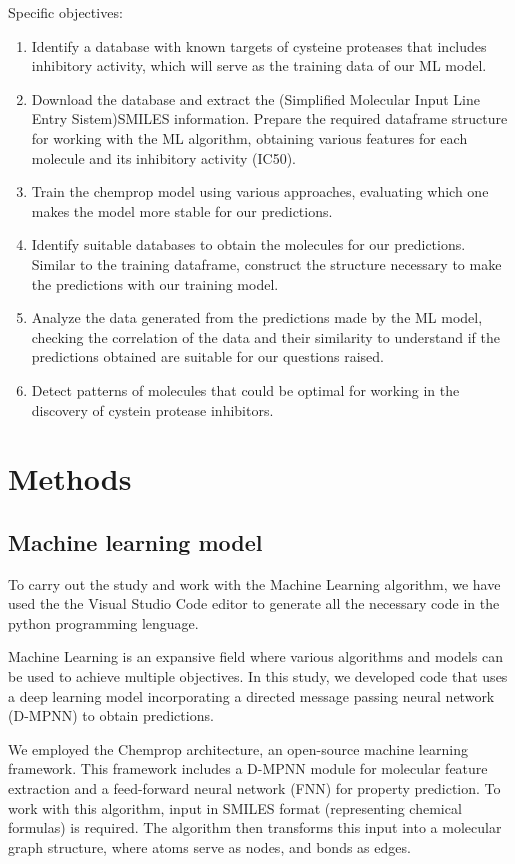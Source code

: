 \documentclass[final,times,twocolumn,article]{elsarticle}
\begin{document}
Specific objectives:

\begin{enumerate}
    \item Identify a database with known targets of cysteine proteases that includes inhibitory activity, which will serve as the training data of our ML model. 
    \item Download the database and extract the (Simplified Molecular Input Line Entry Sistem)SMILES information. Prepare the required dataframe structure for working with the ML algorithm, obtaining various features for each molecule and its inhibitory activity (IC50).
    \item Train the chemprop model using various approaches, evaluating which one makes the model more stable for our predictions. 
    \item Identify suitable databases to obtain the molecules for our predictions. Similar to the training dataframe, construct the structure necessary to make the predictions with our training model. 
    \item Analyze the data generated from the predictions made by the ML model, checking the correlation of the data and their similarity to understand if the predictions obtained are suitable for our questions raised. 
    \item Detect patterns of molecules that could be optimal for working in the discovery of cystein protease inhibitors. 
\end{enumerate}

\section{\textbf{Methods}}

\subsection{Machine learning model}

To carry out the study and work with the Machine Learning algorithm, we have used the the Visual Studio Code editor to generate all the necessary code in the python programming lenguage. 

Machine Learning is an expansive field where various algorithms and models can be used to achieve multiple objectives. In this study, we developed code that uses a deep learning model incorporating a directed message passing neural network (D-MPNN) to obtain predictions. 

We employed the Chemprop architecture, an open-source machine learning framework. This framework includes a D-MPNN module for molecular feature extraction and a feed-forward neural network (FNN) for property prediction. To work with this algorithm, input in SMILES format (representing chemical formulas) is required. The algorithm then transforms this input into a molecular graph structure, where atoms serve as nodes, and bonds as edges. 
\end{document}
